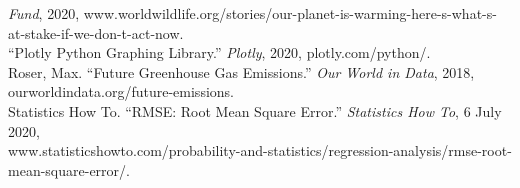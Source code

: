 \documentclass[fontsize=11pt]{article}
\begin{document}
    \newline
    \textit{Fund}, 2020, www.worldwildlife.org/stories/our-planet-is-warming-here-s-what-s-at-stake-if-we-don-t-act-now.\\
    \newline
    “Plotly Python Graphing Library.” \textit{Plotly}, 2020, plotly.com/python/. \\
    \newline
    Roser, Max. “Future Greenhouse Gas Emissions.” \textit{Our World in Data}, 2018, ourworldindata.org/future-emissions.\\
    \newline
    Statistics How To. “RMSE: Root Mean Square Error.” \textit{Statistics How To}, 6 July 2020, \\

    \newline
    www.statisticshowto.com/probability-and-statistics/regression-analysis/rmse-root-mean-square-error/.
\end{document}
